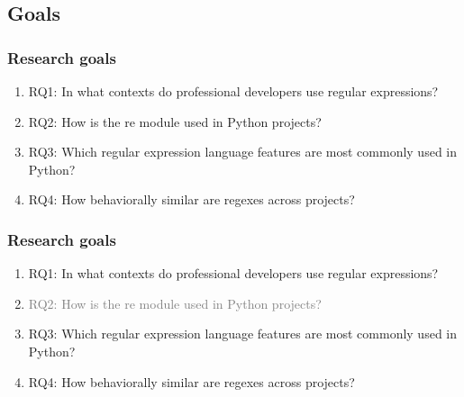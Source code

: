 
\subsection{Goals}

\begin{frame}
\frametitle{Research goals}

\begin{enumerate}
\item RQ1: In what contexts do professional developers use regular expressions?
\item RQ2: How is the re module used in Python projects?
\item RQ3: Which regular expression language features are most commonly used in Python?
\item RQ4: How behaviorally similar are regexes across projects?
\end{enumerate}

\end{frame}

\begin{frame}
\frametitle{Research goals}

\begin{enumerate}
\item RQ1: In what contexts do professional developers use regular expressions?
\item \textcolor{gray}{RQ2: How is the re module used in Python projects?}
\item RQ3: Which regular expression language features are most commonly used in Python?
\item RQ4: How behaviorally similar are regexes across projects?
\end{enumerate}

\end{frame}
